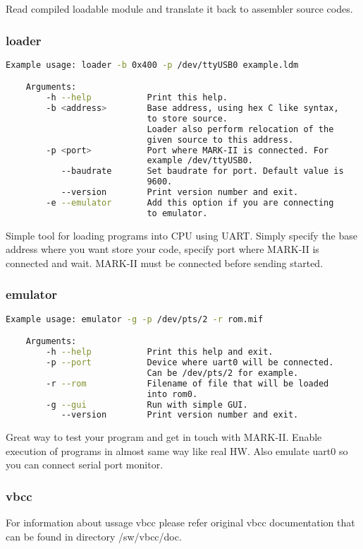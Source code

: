 Read compiled loadable module and translate it back to assembler source codes.

\subsubsection{loader}

\begin{lstlisting}[language=bash, frame=single]
    Example usage: loader -b 0x400 -p /dev/ttyUSB0 example.ldm

    Arguments:
        -h --help           Print this help.
        -b <address>        Base address, using hex C like syntax,
                            to store source.
                            Loader also perform relocation of the
                            given source to this address.
        -p <port>           Port where MARK-II is connected. For
                            example /dev/ttyUSB0.
           --baudrate       Set baudrate for port. Default value is
                            9600.
           --version        Print version number and exit.
        -e --emulator       Add this option if you are connecting
                            to emulator.
\end{lstlisting}

Simple tool for loading programs into CPU using UART. Simply specify the base
address where you want store your code, specify port where MARK-II is connected
and wait. MARK-II must be connected before sending started.

\subsubsection{emulator}

\begin{lstlisting}[language=bash, frame=single]
    Example usage: emulator -g -p /dev/pts/2 -r rom.mif

    Arguments:
        -h --help           Print this help and exit.
        -p --port           Device where uart0 will be connected.
                            Can be /dev/pts/2 for example.
        -r --rom            Filename of file that will be loaded
                            into rom0.
        -g --gui            Run with simple GUI.
           --version        Print version number and exit.
\end{lstlisting}

Great way to test your program and get in touch with MARK-II. Enable execution
of programs in almost same way like real HW. Also emulate uart0 so you can
connect serial port monitor.

\subsubsection{vbcc}

For information about ussage vbcc please refer original vbcc documentation that
can be found in directory /sw/vbcc/doc.
